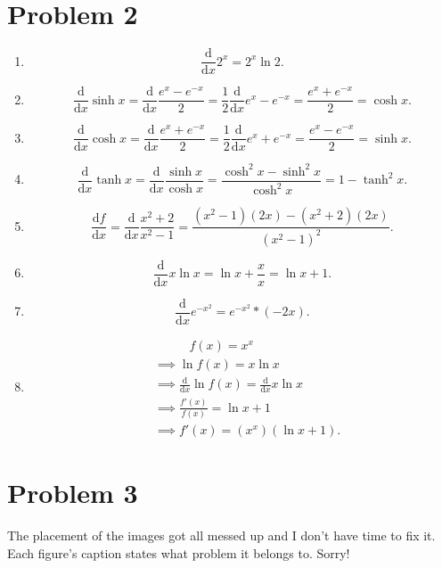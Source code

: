 \documentclass[11pt, letterpaper]{article}
\begin{document}
\section*{Problem 2}
\begin{enumerate}
	\item
		\[
			\frac{\mathrm{d}}{\mathrm{d}x} 2^x = 2^x\ln 2
		.\]
	\item
		\[
			\frac{\mathrm{d}}{\mathrm{d}x} \operatorname{sinh } x = \frac{\mathrm{d}}{\mathrm{d}x} \frac{e^x-e^{-x} }{2} =\frac{1}{2} \frac{\mathrm{d}}{\mathrm{d}x} e^x-e^{-x} =\frac{e^x+e^{-x} }{2} =\operatorname{cosh} x
		.\]
	\item 
		\[
			\frac{\mathrm{d}}{\mathrm{d}x} \operatorname{cosh } x = \frac{\mathrm{d}}{\mathrm{d}x} \frac{e^x+e^{-x} }{2} =\frac{1}{2} \frac{\mathrm{d}}{\mathrm{d}x} e^x+e^{-x} =\frac{e^x-e^{-x} }{2} =\operatorname{sinh} x
		.\]
	\item
		\[
			\frac{\mathrm{d}}{\mathrm{d}x} \operatorname{tanh } x = \frac{\mathrm{d}}{\mathrm{d}x} \frac{\sinh x}{\cosh x} =\frac{\cosh^2 x - \sinh^2 x}{\cosh^2 x} =1-\tanh^2 x
		.\]
	\item 
		\[
			\frac{\mathrm{d}f}{\mathrm{d}x} =\frac{\mathrm{d}}{\mathrm{d}x} \frac{x^2+2}{x^2-1} = \frac{\left( x^2-1 \right) (2x)-\left( x^2+2 \right) (2x)}{\left( x^2-1 \right)^2 } 
		.\]
	\item 
		\[
			\frac{\mathrm{d}}{\mathrm{d}x} x \ln x = \ln x + \frac{x}{x} = \ln x + 1
		.\]
	\item
		\[
			\frac{\mathrm{d}}{\mathrm{d}x} e^{-x^2} =e^{-x^2} *(-2x)
		.\]
	\item
		\begin{align*}
			&\qquad\;\;\;f(x)=x^x\\
			&\implies \ln f(x) = x \ln x\\
			&\implies \frac{\mathrm{d}}{\mathrm{d}x} \ln f(x) = \frac{\mathrm{d}}{\mathrm{d}x} x \ln x\\
			&\implies \frac{f'(x)}{f(x)} = \ln x + 1\\
			&\implies f'(x)= \left( x^x \right) \left( \ln x + 1 \right) 
		.\end{align*}
\end{enumerate}
\section*{Problem 3}
The placement of the images got all messed up and I don't have time to fix it. Each figure's caption states what problem it belongs to. Sorry!
\end{document}
